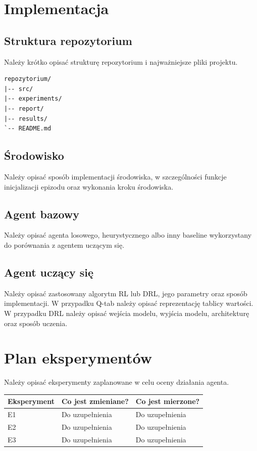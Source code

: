 \documentclass[12pt]{article}
\begin{document}
\section{Implementacja}

\subsection{Struktura repozytorium}

Należy krótko opisać strukturę repozytorium i najważniejsze pliki projektu.

\begin{verbatim}
repozytorium/
|-- src/
|-- experiments/
|-- report/
|-- results/
`-- README.md
\end{verbatim}

\subsection{Środowisko}

Należy opisać sposób implementacji środowiska, w szczególności funkcje inicjalizacji epizodu oraz wykonania kroku środowiska.

\subsection{Agent bazowy}

Należy opisać agenta losowego, heurystycznego albo inny baseline wykorzystany do porównania z agentem uczącym się.

\subsection{Agent uczący się}

Należy opisać zastosowany algorytm RL lub DRL, jego parametry oraz sposób implementacji. W przypadku Q-tab należy opisać reprezentację tablicy wartości. W przypadku DRL należy opisać wejścia modelu, wyjścia modelu, architekturę oraz sposób uczenia.

\section{Plan eksperymentów}

Należy opisać eksperymenty zaplanowane w celu oceny działania agenta.

\begin{center}
\begin{tabular}{p{}p{}p{}}
\toprule
Eksperyment & Co jest zmieniane? & Co jest mierzone? \\
\midrule
E1 & Do uzupełnienia & Do uzupełnienia \\
E2 & Do uzupełnienia & Do uzupełnienia \\
E3 & Do uzupełnienia & Do uzupełnienia \\
\bottomrule
\end{tabular}
\end{center}
\end{document}
